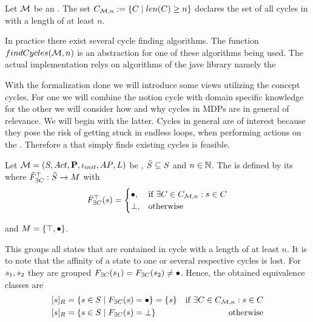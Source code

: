 \documentclass[preview]{standalone}
\begin{document}
\begin{definition}
	Let ${{{\mathcal{M}}}}$ be an \chgphN. The set ${{C}_{{{\mathcal{M}}}, n}} := \{ {C} \mid {len}({C}) \geq n\}$ declares the set of all cycles in \chgph with a length of at least $n$.
\end{definition}

In practice there exist several cycle finding algorithms. The function ${findCycles}({{{\mathcal{M}}}}, n)$ is an abstraction for one of these algorithms being used. The actual implementation relys on algorithms of the jave library \jgrapht namely the 

With the formalization done we will introduce some views utilizing the concept cycles. For one we will combine the notion cycle with domain specific knowledge for the other we will consider how and why cycles in MDPs are in general of relevance. We will begin with the latter.  Cycles in general are of interest because they pose the risk of getting stuck in endless loops, when performing actions on the \mdpN.  Therefore a \viewN that simply finds existing cycles is feasible.


\begin{definition}
	Let ${{{\mathcal{M}}}} = {{({S}, {Act}, {\textbf{P}}, {\iota_{init}}, {AP}, {L})}}$ be \achgphN, ${\tilde{{S}}} \subseteq {S}$ and $n \in {\mathbb{N}}$. The \viewN \viewhascycle is defined by its \grpfctN \gfcthascycle where ${{\tilde{F}_{{\exists{C}}}}^{\top}} : {\tilde{{S}}} \to {\ensuremath{{M}}}$ with
	\[
	\gfctsubhascycle(\state) =
	\begin{cases}
			\remelem, &\text{if } \exists \cycle \in \cycleset : \state \in \cycle \\
			\notppty, &\text{otherwise}
		\end{cases}
	\]
	
	and ${{M}} = \{{\top}, {\bullet}\}$.
\end{definition}

This \viewN groups all states that are contained in cycle with a length of at least $n$. It is to note that the affinity of a state to one or several respective cycles is lost. For ${s}_1, {s}_2$ they are grouped ${{F_{{\exists{C}}}}}({s}_1) = {{F_{{\exists{C}}}}}({s}_2) \neq {\bullet}$. Hence, the obtained equivalence classes are
\begin{align*}
	\eqclassv &= \{\state \in \states \mid \gfcthascycle(\state) = \remelem\} = \{\state\} &\text{if } \exists \cycle \in \cycleset : \state \in \cycle \\
	\eqclassv &= \{\state \in \states \mid \gfcthascycle(\state) = \notppty\} &\text{otherwise}
\end{align*}
\end{document}
